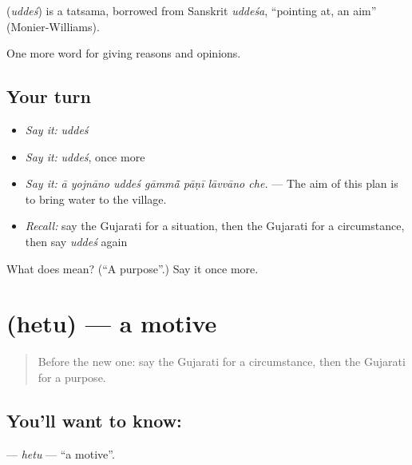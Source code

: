 \begin{cousinweb}
\textbf{} (\emph{uddeś}) is a tatsama, borrowed from Sanskrit \emph{uddeśa}, \textquotedblleft{}pointing at, an aim\textquotedblright{} (Monier-Williams).
\end{cousinweb}

\begin{grammarlens}[title={What you've built}]
One more word for giving reasons and opinions.
\end{grammarlens}

\subsection*{Your turn}
\begin{itemize}
\raggedright
  \item \emph{Say it:} \emph{uddeś}
  \item \emph{Say it:} \emph{uddeś}, once more
  \item \emph{Say it:} \emph{ā yojnāno uddeś gāmmā̃ pāṇī lāvvāno che.} — The aim of this plan is to bring water to the village.
  \item \emph{Recall:} say the Gujarati for a situation, then the Gujarati for a circumstance, then say \emph{uddeś} again
\end{itemize}

\begin{tcolorbox}[breakable,colback=teal!4,colframe=teal!35!black,title={Before you move on}]
What does  mean? (\textquotedblleft{}A purpose\textquotedblright{}.) Say it once more.
\end{tcolorbox}
\section[\texorpdfstring{\gu{હેતુ} (hetu)}{હેતુ (hetu)}]{ (hetu) — a motive}

\label{lesson:GU-C340-hetu}



\begin{quote}
Before the new one: say the Gujarati for a circumstance, then the Gujarati for a purpose.
\end{quote}

\subsection*{You'll want to know: }
\textbf{} — \emph{hetu} — \textquotedblleft{}a motive\textquotedblright{}.

